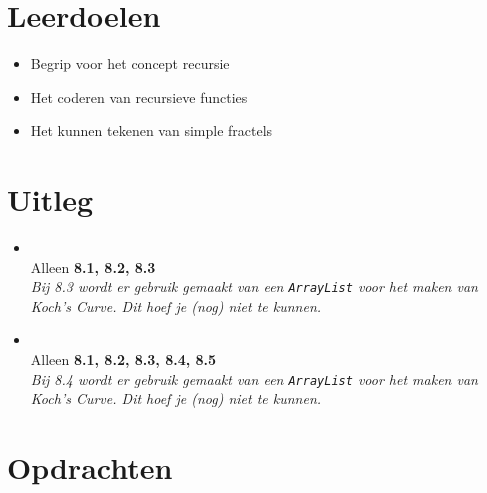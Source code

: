 \documentclass{../qh_exercise}
\begin{document}
\section{Leerdoelen}
\begin{itemize}
    \item Begrip voor het concept recursie
    \item Het coderen van recursieve functies
    \item Het kunnen tekenen van simple fractels
\end{itemize}

\section{Uitleg}
\begin{itemize}
    \item {}\\
    Alleen \textbf{8.1, 8.2, 8.3}\\
    \textit{Bij 8.3 wordt er gebruik gemaakt van een \texttt{ArrayList} voor het maken van Koch's Curve. Dit hoef je (nog) niet te kunnen.}
    \item {}\\
    Alleen \textbf{8.1, 8.2, 8.3, 8.4, 8.5}\\
    \textit{Bij 8.4 wordt er gebruik gemaakt van een \texttt{ArrayList} voor het maken van Koch's Curve. Dit hoef je (nog) niet te kunnen.}
\end{itemize}

\newpage
\section{Opdrachten}
\end{document}

